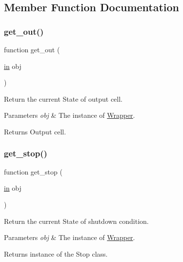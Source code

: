 \subsection{Member Function Documentation}
\mbox{\label{class_wrapper_a15af7c208437e3c98d1f130b45a36a37}} 
\subsubsection{\texorpdfstring{get\+\_\+out()}{get\_out()}}
{\footnotesize\ttfamily function get\+\_\+out (\begin{DoxyParamCaption}\item[{\hyperlink{class_wrapper_a5e252d97ca5bf85c5753e2914673eead}{in}}]{obj }\end{DoxyParamCaption})}



Return the current State of output cell. 


\begin{DoxyParams}{Parameters}
{\em obj} & The instance of \hyperlink{class_wrapper}{Wrapper}. \\
\hline
\end{DoxyParams}
\begin{DoxyReturn}{Returns}
Output cell. 
\end{DoxyReturn}
\mbox{\label{class_wrapper_aaba4a98b8b3bf391348722f0f227e333}} 
\subsubsection{\texorpdfstring{get\+\_\+stop()}{get\_stop()}}
{\footnotesize\ttfamily function get\+\_\+stop (\begin{DoxyParamCaption}\item[{\hyperlink{class_wrapper_a5e252d97ca5bf85c5753e2914673eead}{in}}]{obj }\end{DoxyParamCaption})}



Return the current State of shutdown condition. 


\begin{DoxyParams}{Parameters}
{\em obj} & The instance of \hyperlink{class_wrapper}{Wrapper}. \\
\hline
\end{DoxyParams}
\begin{DoxyReturn}{Returns}
instance of the Stop class. 
\end{DoxyReturn}
\mbox{\label{class_wrapper_a7d486dd79e7c7bc857ffaa4e273d27c5}} 
